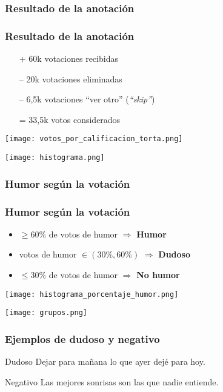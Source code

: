 \subsubsection{Resultado de la anotación}
\begin{frame}[allowframebreaks]
    \frametitle{Resultado de la anotación}

    \begin{itemize}
        \item[+] 60k votaciones recibidas
        \item[--] 20k votaciones eliminadas
        \item[--] 6,5k votaciones “ver otro” (\emph{“skip”})
        \item[=] 33,5k votos considerados
    \end{itemize}

    \framebreak

    \begin{center}
        \texttt{[image: votos\_por\_calificacion\_torta.png]}

        \texttt{[image: histograma.png]}
    \end{center}
\end{frame}

\subsubsection{Humor según la votación}

\begin{frame}[allowframebreaks]
    \frametitle{Humor según la votación}

    \begin{itemize}
        \item $\geq 60\%$ de votos de humor $\Rightarrow$ \textbf{Humor}
        \item votos de humor $\in (30\%, 60\%)$ $\Rightarrow$ \textbf{Dudoso}
        \item $\leq 30\%$ de votos de humor $\Rightarrow$ \textbf{No humor}
    \end{itemize}

    \begin{center}
        \texttt{[image: histograma\_porcentaje\_humor.png]}

        \texttt{[image: grupos.png]}
    \end{center}
\end{frame}

\begin{frame}
    \frametitle{Ejemplos de dudoso y negativo}

    \begin{block}{Dudoso}
        Dejar para mañana lo que ayer dejé para hoy.
    \end{block}{}

    \begin{block}{Negativo}
        Las mejores sonrisas son las que nadie entiende.
    \end{block}{}
\end{frame}

